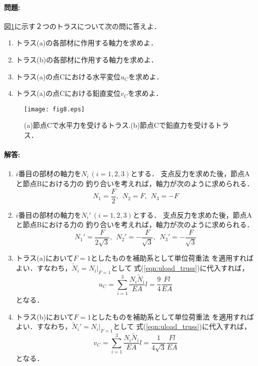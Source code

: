 \documentclass[10pt,a4j]{jarticle}
\begin{document}
\paragraph{問題:}
図\ref{fig:fig8}に示す２つのトラスについて次の問に答えよ．
\begin{enumerate}
\item
	トラス(a)の各部材に作用する軸力を求めよ．
\item
	トラス(b)の各部材に作用する軸力を求めよ．
\item
	トラス(a)の点Cにおける水平変位$u_C$を求めよ．
\item
	トラス(a)の点Cにおける鉛直変位$v_C$を求めよ．
\end{enumerate}
\begin{figure}
	\begin{center}
	\texttt{[image: fig8.eps]} 
	\end{center}
	\caption{(a)節点Cで水平力を受けるトラス.(b)節点Cで鉛直力を受けるトラス．}
	\label{fig:fig8}
\end{figure}
\paragraph{解答:}
\begin{enumerate}
\item
	$i$番目の部材の軸力を$N_i\,(i=1,2,3)$とする．
	支点反力を求めた後，節点Aと節点Bにおける力の
	釣り合いを考えれば，軸力が次のように求められる．
	\begin{equation}
		N_1=\frac{F}{2}, \ \ N_2=F, \ \ N_3=-F 
		\label{eqn:}
	\end{equation}
\item
	$i$番目の部材の軸力を$N_i'\,(i=1,2,3)$とする．
	支点反力を求めた後，節点Aと節点Bにおける力の
	釣り合いを考えれば，軸力が次のように求められる．
	\begin{equation}
	N_1'=\frac{F}{2\sqrt{3}}, \ \ N_2'=-\frac{F}{\sqrt{3}}, \ \ N_3'=- \frac{F}{\sqrt{3}}
	\label{eqn:}
	\end{equation}
\item
	トラス(a)において$F=1$としたものを補助系として単位荷重法
	を適用すればよい．すなわち，$\tilde N_i=\left. N_i\right|_{F=1}$として
	式(\ref{eqn:uload_truss})に代入すれば，
	\begin{equation}
		u_C=\sum_{i=1}^3 \frac{N_i\tilde N_i}{EA}l=\frac{9}{4}\frac{Fl}{EA}
	\end{equation}
	となる．
\item
	トラス(b)において$F=1$としたものを補助系として単位荷重法
	を適用すればよい．すなわち，$\tilde N_i'=\left. N_i\right|_{F=1}$として
	式(\ref{eqn:uload_truss})に代入すれば，
	\begin{equation}
		v_C=\sum_{i=1}^3 \frac{N_i\tilde N_i}{EA}l=\frac{1}{4\sqrt{3}}\frac{Fl}{EA}
	\end{equation}
	となる．	
\end{enumerate}
\newpage
\end{document}
